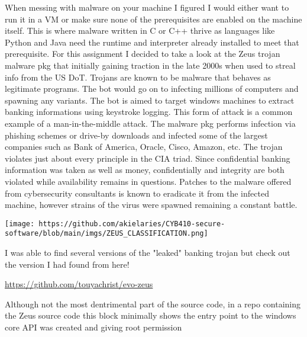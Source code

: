 When messing with malware on your machine I figured I would either want
to run it in a VM or make sure none of the prerequisites are enabled on
the machine itself. This is where malware written in C or C++ thrive as
languages like Python and Java need the runtime and interpreter already
installed to meet that prerequisite. For this assignment I decided to
take a look at the Zeus trojan malware pkg that initially gaining
traction in the late 2000s when used to streal info from the US DoT.
Trojans are known to be malware that behaves as legitimate programs. The
bot would go on to infecting millions of computers and spawning any
variants. The bot is aimed to target windows machines to extract banking
informations using keystroke logging. This form of attack is a common
example of a man-in-the-middle attack. The malware pkg performs
infection via phishing schemes or drive-by downloads and infected some
of the largest companies such as Bank of America, Oracle, Cisco, Amazon,
etc. The trojan violates just about every principle in the CIA triad.
Since confidential banking information was taken as well as money,
confidentially and integrity are both violated while availability
remains in questions. Patches to the malware offered from cybersecurity
consultants is known to eradicate it from the infected machine, however
strains of the virus were spawned remaining a constant battle.

\texttt{[image: https://github.com/akielaries/CYB410-secure-software/blob/main/imgs/ZEUS\_CLASSIFICATION.png]}

I was able to find several versions of the "leaked" banking trojan but
check out the version I had found from here!

\href{https://github.com/touyachrist/evo-zeus}{https://github.com/touyachrist/evo-zeus}

Although not the most dentrimental part of the source code, in a repo
containing the Zeus source code this block minimally shows the entry
point to the windows core API was created and giving root permission

\begin{Shaded}
\begin{Highlighting}[]
\NormalTok{) \{}
  

  
\NormalTok{\}}
\end{Highlighting}
\end{Shaded}

